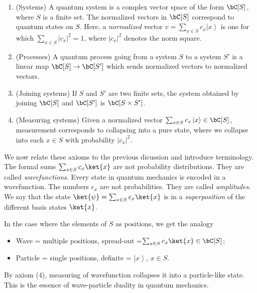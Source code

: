 \begin{defn} $\,$

\begin{enumerate}
\item (Systems) A quantum system is a complex vector space of the form $\bC[S]$, where $S$ is a finite set. The normalized vectors in $\bC[S]$ correspond to quantum states on $S$. Here, a {\em normalized} vector $v=\sum_{x\in S}c_x\left|x\right>$ is one for which $\sum_{x\in S}|c_x|^2=1$, where $|c_x|^2$ denotes the norm square.
\item (Processes) A quantum process going from a system $S$ to a system $S'$ is a linear map $\bC[S]\to \bC[S']$ which sends normalized vectors to normalized vectors.
\item (Joining systems) If $S$ and $S'$ are two finite sets, the system obtained by joining $\bC[S]$ and $\bC[S']$ is $\bC[S\times S']$.
\item (Measuring systems) Given a normalized vector $\sum_{x\in S}c_x \left |x\right>\in \bC[S]$, measurement corresponds to collapsing into a pure state, where we collapse into each $x\in S$ with probability $|c_x|^2$.
\end{enumerate}

\raggedleft\qedsymbol{}
\end{defn}

We now relate these axioms to the previous dicussion and introduce terminology. The formal sums $\sum_{x\in S}c_x\ket{x}$ are not probability distributions. They are called {\em wavefunctions}. Every state in quantum mechanics is encoded in a wavefunction. The numbers $c_x$ are not probabilities. They are called {\em amplitudes}. We say that the state $\ket{\psi}=\sum_{x\in S}c_x \ket{x}$ is in a {\em superposition} of the different basis states $\ket{x}$.

\begin{rem} In the case where the elements of $S$ as positions, we get the analogy

\begin{itemize}
\item Wave = multiple positions, spread-out =$\sum_{x\in S}c_x\ket{x}\in \bC[S]$;
\item Particle = single positions, definite = $\left|x\right>$, $x\in S$.
\end{itemize}

By axiom (4), measuring of wavefunction collapses it into a particle-like state. This is the essence of wave-particle duality in quantum mechanics.
\end{rem}

